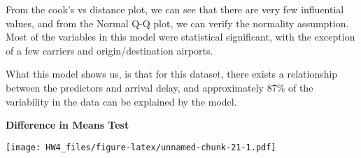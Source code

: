 \documentclass[
]{article}
\newenvironment{Shaded}{\begin{snugshade}}{\end{snugshade}}
\newcommand{\AttributeTok}[1]{\textcolor[rgb]{0.77,0.63,0.00}{#1}}
\newcommand{\DecValTok}[1]{\textcolor[rgb]{0.00,0.00,0.81}{#1}}
\newcommand{\FunctionTok}[1]{\textcolor[rgb]{0.00,0.00,0.00}{#1}}
\newcommand{\NormalTok}[1]{#1}
\newcommand{\OtherTok}[1]{\textcolor[rgb]{0.56,0.35,0.01}{#1}}
\newcommand{\SpecialCharTok}[1]{\textcolor[rgb]{0.00,0.00,0.00}{#1}}
\newcommand{\StringTok}[1]{\textcolor[rgb]{0.31,0.60,0.02}{#1}}
\begin{document}
From the cook's vs distance plot, we can see that there are very few
influential values, and from the Normal Q-Q plot, we can verify the
normality assumption. Most of the variables in this model were
statistical significant, with the exception of a few carriers and
origin/destination airports.

What this model shows us, is that for this dataset, there exists a
relationship between the predictors and arrival delay, and approximately
87\% of the variability in the data can be explained by the model.

\textbf{Difference in Means Test}

\begin{Shaded}
\end{Shaded}

\texttt{[image: HW4\_files/figure-latex/unnamed-chunk-21-1.pdf]}

\begin{Shaded}
\end{Shaded}
\end{document}
